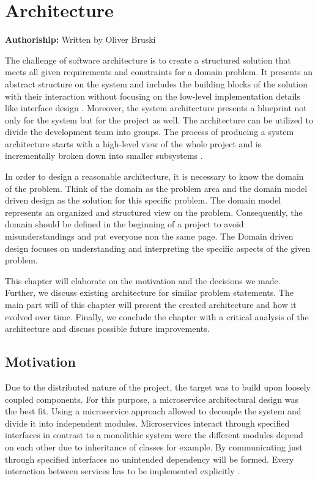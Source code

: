 \section{Architecture}\label{sec:architecture}

\textbf{Authoriship: } Written by Oliver Bruski\\

\vspace*{4mm}


The challenge of software architecture is to create a structured
solution that meets all given requirements and constraints for a domain
problem. It presents an abstract structure on the system and includes
the building blocks of the solution with their interaction without
focusing on the low-level implementation details like interface design
\cite{Garlan&Shaw.1994}. Moreover, the system architecture presents a blueprint
not only for the system but for the project as well. The architecture
can be utilized to divide the development team into groups. The process
of producing a system architecture starts with a high-level view of the
whole project and is incrementally broken down into smaller subsystems
\cite{Bass&Clements&Kazmann.2012}.

In order to design a reasonable architecture, it is necessary to know
the domain of the problem. Think of the domain as the problem area and
the domain model driven design as the solution for this specific
problem. The domain model represents an organized and structured view on
the problem. Consequently, the domain should be defined in the beginning
of a project to avoid misunderstandings and put everyone non the same page. The Domain driven design focuses on
understanding and interpreting the specific aspects of the given
problem.

This chapter will elaborate on the motivation and the decisions we made.
Further, we discuss existing architecture for similar problem
statements. The main part will of this chapter will present the created
architecture and how it evolved over time. Finally, we conclude the
chapter with a critical analysis of the architecture and discuss
possible future improvements.

\subsection{Motivation}\label{motivation}

Due to the distributed nature of the project, the target was to build
upon loosely coupled components. For this purpose, a microservice
architectural design was the best fit. Using a microservice approach
allowed to decouple the system and divide it into independent modules.
Microservices interact through specified interfaces in contrast to a
monolithic system were the different modules depend on each other due to
inheritance of classes for example. By communicating just through
specified interfaces no unintended dependency will be formed. Every
interaction between services has to be implemented explicitly \cite{Wolff.2016}.

